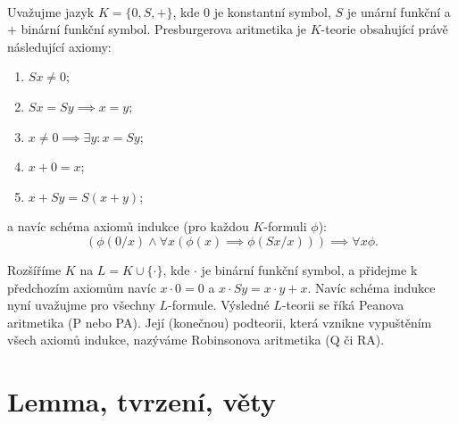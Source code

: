 \documentclass[12pt]{article}                   %
\begin{document}
        \begin{definice}[Aritmetiky]
            \ \\[-3em]

            \begin{definicein}
                Uvažujme jazyk $K = \{0, S, +\}$, kde $0$ je konstantní symbol, $S$ je unární funkční a $+$ binární funkční symbol. Presburgerova aritmetika je $K$-teorie obsahující právě následující axiomy:
        
                \begin{enumerate}
                    \item $Sx ≠ 0$;
                    \item $Sx = Sy \implies x = y$;
                    \item $x ≠ 0 \implies \exists y: x = Sy$;
                    \item $x + 0 = x$;
                    \item $x + Sy = S(x+y)$;
                \end{enumerate}
        
                a navíc schéma axiomů indukce (pro každou $K$-formuli $\phi$):
                $$ (\phi(0/x) \land \forall x (\phi(x) \implies \phi(Sx/x))) \implies \forall x \phi. $$ 
            \end{definicein}

            \begin{definicein}
                Rozšíříme $K$ na $L = K \cup \{·\}$, kde $·$ je binární funkční symbol, a přidejme k předchozím axiomům navíc $x·0 = 0$ a $x·Sy = x·y + x$. Navíc schéma indukce nyní uvažujme pro všechny $L$-formule. Výsledné $L$-teorii se říká Peanova aritmetika (P nebo PA). Její (konečnou) podteorii, která vznikne vypuštěním všech axiomů indukce, nazýváme Robinsonova aritmetika (Q či RA).
            \end{definicein}
        \end{definice}

\section{Lemma, tvrzení, věty}
\end{document}
